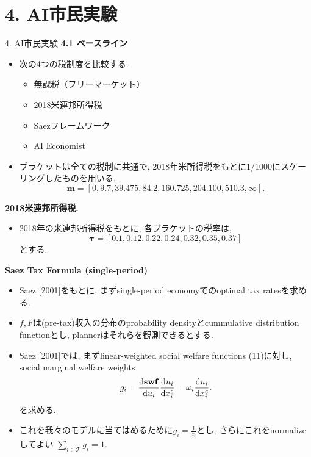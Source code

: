 \documentclass[unicode,aspectratio=169,11pt]{beamer}
\begin{document}
\section{4. AI市民実験}
\begin{frame}{4. AI市民実験}{}
{\large\bf 4.1 ベースライン}
\begin{itemize}
    \item 次の4つの税制度を比較する.
    \begin{itemize}
        \item 無課税（フリーマーケット）
        \item 2018米連邦所得税
        \item Saezフレームワーク
        \item AI Economist
    \end{itemize}
    \item ブラケットは全ての税制に共通で, 2018年米所得税をもとに1/1000にスケーリングしたものを用いる.
    \[ \bm{m} = [0, 9.7, 39.475, 84.2, 160.725, 204.100, 510.3, \infty]. \tag{15} \]
\end{itemize}
\end{frame}

\begin{frame}{}{}
{\bf 2018米連邦所得税.}
\begin{itemize}
    \item 2018年の米連邦所得税をもとに, 各ブラケットの税率は, 
    \[ \bm{\tau} = [0.1, 0.12, 0.22, 0.24, 0.32, 0.35, 0.37] \tag{16} \]
    とする.
\end{itemize}    
\end{frame}

\begin{frame}{}{}
{\bf Saez Tax Formula (single-period)}
\begin{itemize}
    \item Saez [2001]をもとに, まずsingle-period economyでのoptimal tax ratesを求める.
    \item $f, F$は(pre-tax)収入の分布のprobability densityとcummulative distribution functionとし, plannerはそれらを観測できるとする.
    \item Saez [2001]では, まずlinear-weighted social welfare functions (11)に対し, social marginal welfare weights
    \[ g_i = \frac{\mathrm{d}{\bf swf}}{\mathrm{d} u_i} \frac{\mathrm{d} u_i}{\mathrm{d} x_{i}^c} = \omega_i \frac{\mathrm{d} u_i}{\mathrm{d} x_{i}^c}.  \]
    を求める.
    \item これを我々のモデルに当てはめるために$g_i = \frac{1}{z_i}$とし, さらにこれをnormalizeしてよい $\sum_{i \in \mathscr{T}}g_i = 1$.
\end{itemize}
\end{frame}
\end{document}
